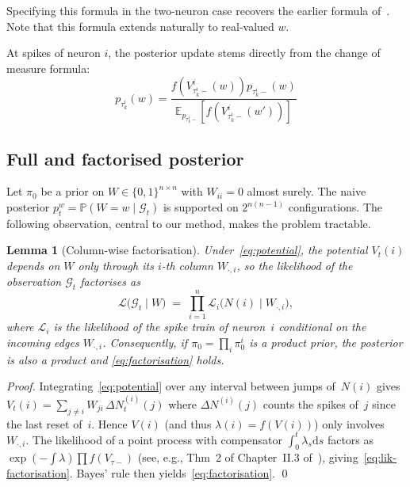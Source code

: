 \documentclass[11pt,a4paper]{article}
\newtheorem{lemma}[theorem]{Lemma}
\theoremstyle{definition}
\newcommand{\Prob}{\mathbb{P}}
\newcommand{\cG}{\mathcal{G}}
\newcommand{\cL}{\mathcal{L}}
\begin{document}
Specifying this formula in the two-neuron case recovers the earlier formula of~. Note that this formula extends naturally to real-valued $w$.

At spikes of neuron $i$, the posterior update stems directly from the change of measure formula:
$$
p_{\tau_k^i} (w) = \frac{f(V_{\tau_k^i-}^i (w)) p_{\tau_k^i-} (w)}{\mathbb{E}_{p_{\tau_k^i-}}[f(V_{\tau_k^i-}^i (w'))]}
$$

\subsection{Full and factorised posterior}

Let $\pi_0$ be a prior on $W \in \{0, 1\}^{n \times n}$ with
$W_{i i} = 0$ almost surely. The naive posterior
$p_t^w = \Prob(W = w \mid \cG_t)$ is supported on
$2^{n(n-1)}$ configurations. The following observation, central to our
method, makes the problem tractable.

\begin{lemma}[Column-wise factorisation]
\label{lem:factorisation}
Under~\eqref{eq:potential}, the potential $V_t(i)$ depends on $W$ only
through its $i$-th column $W_{\cdot, i}$, so the likelihood of the
observation $\cG_t$ factorises as
\begin{equation}
    \cL\bigl( \cG_t \mid W \bigr) \;=\; \prod_{i=1}^n
        \cL_i\bigl( N(i) \mid W_{\cdot, i} \bigr),
    \label{eq:lik-factorisation}
\end{equation}
where $\cL_i$ is the likelihood of the spike train of neuron~$i$
conditional on the incoming edges $W_{\cdot, i}$. Consequently, if
$\pi_0 = \prod_i \pi_0^i$ is a product prior, the posterior is also
a product and \eqref{eq:factorisation} holds.
\end{lemma}

\begin{proof}
Integrating~\eqref{eq:potential} over any interval between jumps
of~$N(i)$ gives $V_t(i) = \sum_{j \neq i} W_{j i}\,\Delta N_t^{(i)}(j)$
where $\Delta N^{(i)}(j)$ counts the spikes of~$j$ since the last
reset of~$i$. Hence $V(i)$ (and thus $\lambda(i) = f(V(i))$)
only involves $W_{\cdot, i}$. The likelihood of a point process with
compensator $\int_0^t \lambda_s \mathrm{d} s$ factors as
$\exp(-\int \lambda) \prod f(V_{\tau-})$ (see, e.g., Thm~2 of
Chapter~II.3 of~\citealp{Bremaud1981}), giving~\eqref{eq:lik-factorisation}.
Bayes' rule then yields~\eqref{eq:factorisation}.
\qed
\end{proof}
\end{document}
